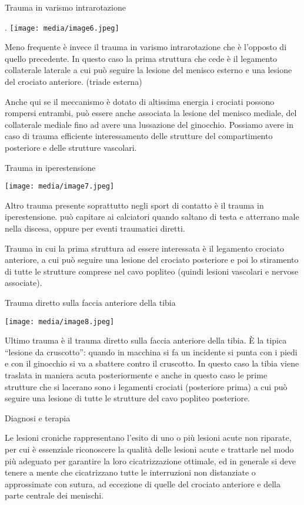 \documentclass[]{article}
\begin{document}
Trauma in varismo intrarotazione

. \texttt{[image: media/image6.jpeg]}

Meno frequente è invece il trauma in varismo intrarotazione che è
l'opposto di quello precedente. In questo caso la prima struttura che
cede è il legamento collaterale laterale a cui può seguire la lesione
del menisco esterno e una lesione del crociato anteriore. (triade
esterna)

Anche qui se il meccanismo è dotato di altissima energia i crociati
possono rompersi entrambi, può essere anche associata la lesione del
menisco mediale, del collaterale mediale fino ad avere una lussazione
del ginocchio. Possiamo avere in caso di trauma efficiente
interessamento delle strutture del compartimento posteriore e delle
strutture vascolari.

Trauma in iperestensione

\texttt{[image: media/image7.jpeg]}

Altro trauma presente soprattutto negli sport di contatto è il trauma in
iperestensione. può capitare ai calciatori quando saltano di testa e
atterrano male nella discesa, oppure per eventi traumatici diretti.

Trauma in cui la prima struttura ad essere interessata è il legamento
crociato anteriore, a cui può seguire una lesione del crociato
posteriore e poi lo stiramento di tutte le strutture comprese nel cavo
popliteo (quindi lesioni vascolari e nervose associate).

Trauma diretto sulla faccia anteriore della tibia

\texttt{[image: media/image8.jpeg]}

Ultimo trauma è il trauma diretto sulla faccia anteriore della tibia. È
la tipica ``lesione da cruscotto'': quando in macchina si fa un
incidente si punta con i piedi e con il ginocchio si va a sbattere
contro il cruscotto. In questo caso la tibia viene traslata in maniera
acuta posteriormente e anche in questo caso le prime strutture che si
lacerano sono i legamenti crociati (posteriore prima) a cui può seguire
una lesione di tutte le strutture del cavo popliteo posteriore.

Diagnosi e terapia

Le lesioni croniche rappresentano l'esito di uno o più lesioni acute non
riparate, per cui è essenziale riconoscere la qualità delle lesioni
acute e trattarle nel modo più adeguato per garantire la loro
cicatrizzazione ottimale, ed in generale si deve tenere a mente che
cicatrizzano tutte le interruzioni non distanziate o approssimate con
sutura, ad eccezione di quelle del crociato anteriore e della parte
centrale dei menischi.
\end{document}
